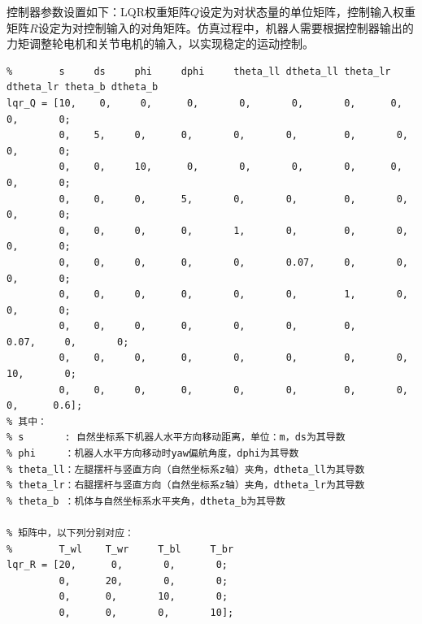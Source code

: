 控制器参数设置如下：LQR权重矩阵$Q$设定为对状态量的单位矩阵，控制输入权重矩阵$R$设定为对控制输入的对角矩阵。仿真过程中，机器人需要根据控制器输出的力矩调整轮电机和关节电机的输入，以实现稳定的运动控制。
\FloatBarrier

\begin{verbatim}
%        s     ds     phi     dphi     theta_ll dtheta_ll theta_lr dtheta_lr theta_b dtheta_b
lqr_Q = [10,    0,     0,      0,       0,       0,       0,      0,       0,       0;
         0,    5,     0,      0,       0,       0,        0,       0,        0,       0;
         0,    0,     10,      0,       0,       0,       0,      0,       0,       0;
         0,    0,     0,      5,       0,       0,        0,       0,        0,       0;
         0,    0,     0,      0,       1,       0,        0,       0,        0,       0;
         0,    0,     0,      0,       0,       0.07,     0,       0,        0,       0;
         0,    0,     0,      0,       0,       0,        1,       0,        0,       0;
         0,    0,     0,      0,       0,       0,        0,       0.07,     0,       0;
         0,    0,     0,      0,       0,       0,        0,       0,        10,       0;
         0,    0,     0,      0,       0,       0,        0,       0,        0,      0.6];
% 其中：
% s       : 自然坐标系下机器人水平方向移动距离，单位：m，ds为其导数
% phi     ：机器人水平方向移动时yaw偏航角度，dphi为其导数
% theta_ll：左腿摆杆与竖直方向（自然坐标系z轴）夹角，dtheta_ll为其导数
% theta_lr：右腿摆杆与竖直方向（自然坐标系z轴）夹角，dtheta_lr为其导数
% theta_b ：机体与自然坐标系水平夹角，dtheta_b为其导数

% 矩阵中，以下列分别对应：
%        T_wl    T_wr     T_bl     T_br
lqr_R = [20,      0,       0,       0;
         0,      20,       0,       0;
         0,      0,       10,       0;
         0,      0,       0,       10];
\end{verbatim}

\FloatBarrier

